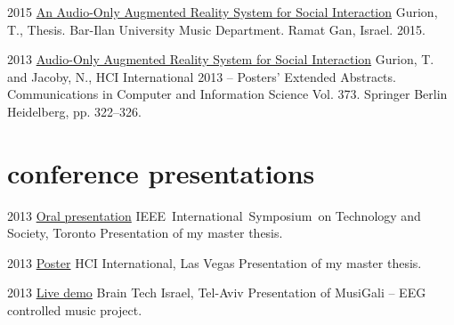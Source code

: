 \documentclass[]{friggeri-cv}  %
\begin{document}
\begin{entrylist}

    \entry
    {2015}
    {\href{http://www.tomgurion.me/pdfs/Gurion - An Audio-Only Augmented Reality System for Social Interaction.pdf}{An Audio-Only Augmented Reality System for Social Interaction}}
    {}
    {Gurion, T., Thesis. Bar-Ilan University Music Department. Ramat Gan, Israel. 2015.}

\end{entrylist}

\begin{entrylist}

    \entry
    {2013}
    {\href{http://www.tomgurion.me/pdfs/Gurion and Jacoby - Audio-Only Augmented Reality System for Social Interaction.pdf}{Audio-Only Augmented Reality System for Social Interaction}}
    {}
    {Gurion, T. and Jacoby, N., HCI International 2013 -- Posters’ Extended Abstracts. Communications in Computer and Information Science Vol. 373. Springer Berlin Heidelberg, pp. 322–326.}

\end{entrylist}


\section{conference presentations}

\begin{entrylist}

    \entry
    {2013}
    {\href{http://www.slideshare.net/Nagasaki45/audioonly-augmented-reality-system-for-social-interaction}{Oral presentation}}
    {IEEE International Symposium on Technology and Society, Toronto}
    {Presentation of my master thesis.}

\end{entrylist}
\begin{entrylist}

    \entry
    {2013}
    {\href{http://www.tomgurion.me/pdfs/HCI2013 poster.pdf}{Poster}}
    {HCI International, Las Vegas}
    {Presentation of my master thesis.}

\end{entrylist}
\begin{entrylist}

    \entry
    {2013}
    {\href{http://www.tomgurion.me/musigali.html}{Live demo}}
    {Brain Tech Israel, Tel-Aviv}
    {Presentation of MusiGali -- EEG controlled music project.}

\end{entrylist}
\end{document}
